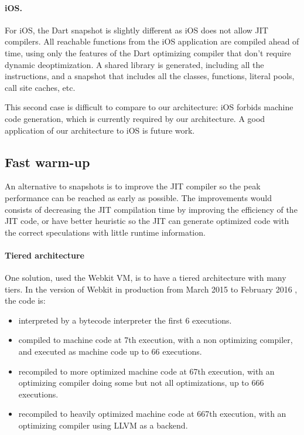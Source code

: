 \documentclass[a4paper,12pt,twoside]{../includes/ThesisStyle}
\begin{document}
\paragraph{iOS.} For iOS, the Dart snapshot is slightly different as iOS does not allow JIT compilers. All reachable functions from the iOS application are compiled ahead of time, using only the features of the Dart optimizing compiler that don't require dynamic deoptimization. A shared library is generated, including all the instructions, and a snapshot that includes all the classes, functions, literal pools, call site caches, etc.

This second case is difficult to compare to our architecture: iOS forbids machine code generation, which is currently required by our architecture. A good application of our architecture to iOS is future work.

\subsection{Fast warm-up}

An alternative to snapshots is to improve the JIT compiler so the peak performance can be reached as early as possible. The improvements would consists of decreasing the JIT compilation time by improving the efficiency of the JIT code, or have better heuristic so the JIT can generate optimized code with the correct speculations with little runtime information.

\paragraph{Tiered architecture}
One solution, used the Webkit VM\cite{Webkit15}, is to have a tiered architecture with many tiers. In the version of Webkit in production from March 2015 to February 2016 \cite{Webkit15}, the code is:
\begin{itemize}
\item interpreted by a bytecode interpreter the first 6 executions.
\item compiled to machine code at 7th execution, with a non optimizing compiler, and executed as machine code up to 66 executions.
\item recompiled to more optimized machine code at 67th execution, with an optimizing compiler doing some but not all optimizations, up to 666 executions.
\item recompiled to heavily optimized machine code at 667th execution, with an optimizing compiler using LLVM as a backend.
\end{itemize}
\end{document}

